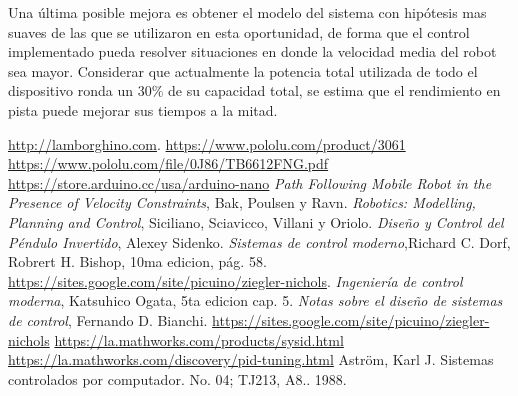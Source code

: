 \documentclass[10pt,conference,a4paper,onecolumn]{article}%
\begin{document}
Una última posible mejora es obtener el modelo del sistema con hipótesis mas suaves de las que se utilizaron en esta oportunidad, de forma que el control implementado pueda resolver situaciones en donde la velocidad media del robot sea mayor. Considerar que actualmente la potencia total utilizada de todo el dispositivo ronda un $30\%$ de su capacidad total, se estima que el rendimiento en pista puede mejorar sus tiempos a la mitad.   
\begin{thebibliography}{X}
 \url{http://lamborghino.com}. 
\url{https://www.pololu.com/product/3061}
\url{ https://www.pololu.com/file/0J86/TB6612FNG.pdf}
 \url{https://store.arduino.cc/usa/arduino-nano}
 \textit{Path Following Mobile Robot in the Presence of Velocity Constraints}, Bak, Poulsen y Ravn.
 \textit{Robotics: Modelling, Planning and Control}, Siciliano, Sciavicco, Villani y Oriolo.
 \textit{Diseño y Control del Péndulo Invertido}, Alexey Sidenko.
 \textit{Sistemas de control moderno},Richard C. Dorf, Robrert H. Bishop, 10ma edicion, pág. 58.
 \url{https://sites.google.com/site/picuino/ziegler-nichols}.
 \textit{Ingeniería de control moderna}, Katsuhico Ogata, 5ta edicion cap. 5.
 \textit{Notas sobre el diseño de sistemas de control}, Fernando D. Bianchi.
\url{https://sites.google.com/site/picuino/ziegler-nichols}
\url{https://la.mathworks.com/products/sysid.html}
\url{https://la.mathworks.com/discovery/pid-tuning.html}
 Aström, Karl J. Sistemas controlados por computador. No. 04; TJ213, A8.. 1988.
\end{thebibliography}
\end{document}
